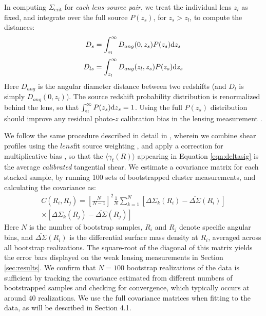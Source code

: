 In computing $\Sigma_{\mathrm{crit}}$ for {\it each lens-source pair}, we treat the individual lens $z_l$ as fixed, and integrate over the full source $P(z_s)$, for $z_s > z_l$, to compute the distances:
\begin{equation}
D_s = \int_{z_l}^{\infty} D_{ang}(0,z_s) P(z_s) {\rm d}z_s
\end{equation}
\begin{equation}
D_{ls} = \int_{z_l}^{\infty} D_{ang}(z_l,z_s) P(z_s) {\rm d}z_s
\end{equation}
Here $D_{ang}$ is the angular diameter distance between two redshifts (and $D_l$ is simply $D_{ang}(0,z_l)$). The source redshift probability distribution is renormalized behind the lens, so that $\int_{z_l}^{\infty} P(z_s) {\rm d}z_s = 1$. Using the full $P(z_s)$ distribution should improve any residual photo-$z$ calibration bias in the lensing measurement \citep{Mandelbaum08a}.

We follow the same procedure described in detail in \citet{Velander14}, wherein we combine shear profiles using the $lens$fit source weighting \citep[Equation 8 of][]{Miller13}, and apply a correction for multiplicative bias \citep{Miller13}, so that the $\langle \gamma_t(R) \rangle$ appearing in Equation \ref{eqn:deltasig} is the average {\it calibrated} tangential shear. We estimate a covariance matrix for each stacked sample, by running 100 sets of bootstrapped cluster measurements, and calculating the covariance as:
\begin{equation}
\begin{split}
C(R_i,R_j) = \left[ \frac{N}{N-1} \right]^2 \frac{1}{N} \sum_{k=1}^{N} \left[\Delta\Sigma_k(R_i) - \overline{\Delta\Sigma}(R_i)\right] \\
\times \left[\Delta\Sigma_k(R_j) - \overline{\Delta\Sigma}(R_j)\right]
\end{split}
\end{equation}
Here $N$ is the number of bootstrap samples, $R_i$ and $R_j$ denote specific angular bins, and $\overline{\Delta\Sigma}(R_i)$ is the differential surface mass density at $R_i$, averaged across all bootstrap realizations. The square-root of the diagonal of this matrix yields the error bars displayed on the weak lensing measurements in Section \ref{sec:results}. We confirm that $N=100$ bootstrap realizations of the data is sufficient by tracking the covariance estimated from different numbers of bootstrapped samples and checking for convergence, which typically occurs at around 40 realizations. We use the full covariance matrices when fitting to the data, as will be described in Section 4.1.

